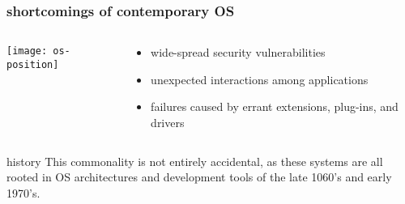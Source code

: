 \begin{frame}[plain]
	\frametitle{shortcomings of contemporary OS}
	
	
	
	\begin{columns}
		
		\begin{column}{.5\textwidth}
			
			\texttt{[image: os-position]}
			
		\end{column}
		
		\begin{column}{.5\textwidth}
			
			\begin{itemize}
				\item wide-spread security vulnerabilities
				\item unexpected interactions among applications
				\item failures caused by errant extensions, plug-ins, and drivers

			\end{itemize}	
		\end{column}
		
		
	\end{columns}
	\pause
\begin{block}{history}
	This commonality is not entirely accidental, as these systems are all
	rooted in OS architectures and development tools of the late 1060's and early 1970's. 
\end{block}

\end{frame}




